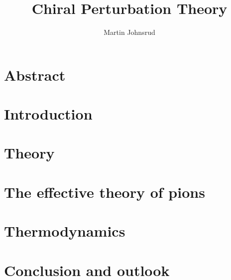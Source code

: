 \documentclass{book}
\title{Chiral Perturbation Theory}
\author{Martin Johnsrud}
\begin{document}
\maketitle 

\tableofcontents

\chapter*{Abstract}


\chapter{Introduction}



\chapter{Theory}
\label{chapter:theory}






\chapter{The effective theory of pions}
\label{chapter:effective theory of pions}









\chapter{Thermodynamics}
\label{chapter:thermodynamics}






\chapter{Conclusion and outlook}
\label{chpater:conclusion and outlook}

\end{document}
